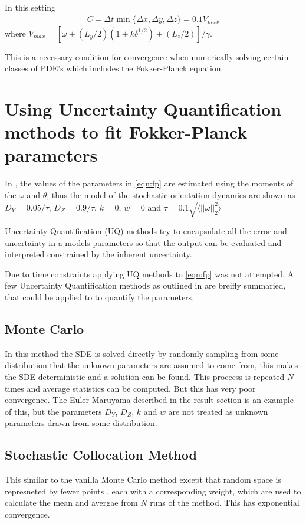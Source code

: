 In this setting 
\begin{align*}
  C = \Delta t \min \{\Delta x, \Delta y, \Delta z\} = 0.1 V_{max}
\end{align*}
where $V_{max} = \left[\omega + \left( L_{y}/2 \right) \left( 1 + k\delta^{1/2}\right) + \left( L_{z}/2 \right) \right] / \gamma$.

This is a necessary condition for convergence when numerically solving certain classes of PDE's which includes the Fokker-Planck equation.


\label{sec:methods}

\section{Using Uncertainty Quantification methods to fit Fokker-Planck parameters}\label{sec:der-sub}

In \cite{main}, the values of the parameters in \ref{eqn:fp} are estimated using the moments of the $\omega$ and $\theta$, thus the model of the stochastic orientation dynamics 
are shown as $D_{Y} = 0.05/\tau$, $D_{Z} = 0.9/\tau$, $k = 0$, $w = 0$ and $\tau = 0.1\sqrt{\langle || \omega||^{2}_{2}\rangle}$

Uncertainty Quantification (UQ) methods try to encapsulate all the error and uncertainty in a models parameters so that the output can be evaluated and interpreted constrained by the 
inherent uncertainty.

Due to time constraints applying UQ methods to \ref{eqn:fp} was not attempted. A few Uncertainty Quantification methods as outlined in \cite{uqm} are breifly summaried, that could be applied to 
 to quantify the parameters. 

\subsection{Monte Carlo}
In this method the SDE is solved directly by randomly sampling from some distribution that the unknown parameters are assumed to come from, this makes the SDE deterministic and a solution can be found. 
This proceess is repeated $N$ times and average statistics can be computed. But this has very poor convergence. The Euler-Maruyama described in the result section is an example of this, but the parameters $D_Y$, $D_Z$, $k$ and $w$
are not treated as unknown parameters drawn from some distribution.

\subsection{Stochastic Collocation Method}
This similar to the vanilla Monte Carlo method except that random space is represneted by fewer points , each with a corresponding weight, which are used to calculate the mean and avergae from $N$ runs of the method.
This has exponential convergence.

